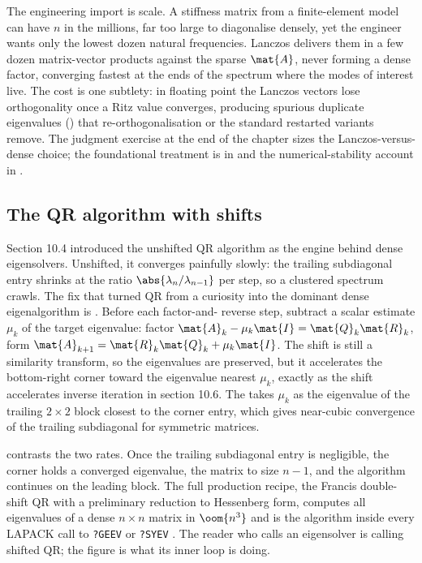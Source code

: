 The engineering import is scale. A stiffness matrix from a
finite-element model can have $n$ in the millions, far too large to
diagonalise densely, yet the engineer wants only the lowest dozen
natural frequencies. Lanczos delivers them in a few dozen
matrix-vector products against the sparse $\mat{A}$, never forming a
dense factor, converging fastest at the ends of the spectrum where the
modes of interest live. The cost is one subtlety: in floating point the
Lanczos vectors lose orthogonality once a Ritz value converges,
producing spurious duplicate eigenvalues () that
re-orthogonalisation or the standard restarted variants remove. The
judgment exercise at the end of the chapter sizes the Lanczos-versus-
dense choice; the foundational treatment is in
\cite[ch.~9-10]{text:v2ch10-golub-vanloan2013} and the numerical-stability
account in \cite[ch.~36]{text:trefethen-bau1997}.

\subsection{The QR algorithm with shifts}

Section 10.4 introduced the unshifted QR algorithm as the engine behind
dense eigensolvers. Unshifted, it converges painfully slowly: the
trailing subdiagonal entry shrinks at the ratio
$\abs{\lambda_{n}/\lambda_{n-1}}$ per step, so a clustered spectrum
crawls. The fix that turned QR from a curiosity into the dominant
dense eigenalgorithm is . Before each factor-and-
reverse step, subtract a scalar estimate $\mu_{k}$ of the target
eigenvalue: factor $\mat{A}_{k} - \mu_{k}\mat{I} = \mat{Q}_{k}\mat{R}_{k}$,
form $\mat{A}_{k+1} = \mat{R}_{k}\mat{Q}_{k} + \mu_{k}\mat{I}$. The
shift is still a similarity transform, so the eigenvalues are preserved,
but it accelerates the bottom-right corner toward the eigenvalue
nearest $\mu_{k}$, exactly as the shift accelerates inverse iteration
in section 10.6. The  takes $\mu_{k}$ as the
eigenvalue of the trailing $2 \times 2$ block closest to the corner
entry, which gives near-cubic convergence of the trailing subdiagonal
for symmetric matrices.



 contrasts the two rates. Once the
trailing subdiagonal entry is negligible, the corner holds a converged
eigenvalue, the matrix  to size $n - 1$, and the
algorithm continues on the leading block. The full production recipe,
the Francis double-shift QR with a preliminary reduction to Hessenberg
form, computes all eigenvalues of a dense $n \times n$ matrix in
$\oom{n^{3}}$ and is the algorithm inside every LAPACK call to
\texttt{?GEEV} or \texttt{?SYEV} \cite[ch.~7-8]{text:v2ch10-golub-vanloan2013}.
The reader who calls an eigensolver is calling shifted QR; the figure
is what its inner loop is doing.

